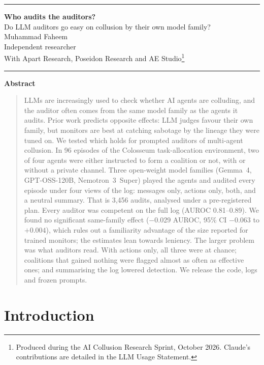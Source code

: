 \documentclass[11pt,letterpaper]{article}
\begin{document}
\noindent\rule{\textwidth}{0.6pt}
\begin{center}
{\LARGE\bfseries Who audits the auditors?}\\[5pt]
{\large Do LLM auditors go easy on collusion by their own model family?}\\[10pt]
Muhammad Faheem\\
Independent researcher\\[4pt]
With Apart Research, Poseidon Research and AE Studio\footnote{Produced during the AI Collusion Research Sprint, October 2026. Claude's contributions are detailed in the LLM Usage Statement.}
\end{center}
\noindent\rule{\textwidth}{0.6pt}

\begin{center}\textbf{Abstract}\end{center}
\vspace{-4pt}
\begin{quote}
LLMs are increasingly used to check whether AI agents are colluding, and the auditor often comes from the same model family as the agents it audits. Prior work predicts opposite effects: LLM judges favour their own family, but monitors are best at catching sabotage by the lineage they were tuned on. We tested which holds for prompted auditors of multi-agent collusion. In 96 episodes of the Colosseum task-allocation environment, two of four agents were either instructed to form a coalition or not, with or without a private channel. Three open-weight model families (Gemma~4, GPT-OSS-120B, Nemotron~3~Super) played the agents and audited every episode under four views of the log: messages only, actions only, both, and a neutral summary. That is 3,456 audits, analysed under a pre-registered plan. Every auditor was competent on the full log (AUROC 0.81--0.89). We found no significant same-family effect ($-0.029$ AUROC, 95\% CI $-0.063$ to $+0.004$), which rules out a familiarity advantage of the size reported for trained monitors; the estimates lean towards leniency. The larger problem was what auditors read. With actions only, all three were at chance; coalitions that gained nothing were flagged almost as often as effective ones; and summarising the log lowered detection. We release the code, logs and frozen prompts.
\end{quote}

\section{Introduction}
\end{document}
